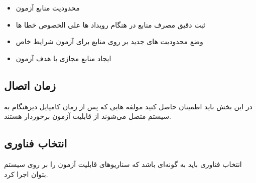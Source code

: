 \begin{itemize}
\item
محدودیت منابع آزمون
\item
ثبت دقیق مصرف منابع در هنگام رویداد ها علی الخصوص خطا ها
\item
وضع محدودیت های جدید بر روی منابع برای آزمون شرایط خاص
\item
ایجاد منابع مجازی با هدف آزمون
\end{itemize}
\subsection{زمان اتصال}
در این بخش باید اطمینان حاصل کنید مولفه هایی که پس از زمان کامپایل دیرهنگام به سیستم متصل می‌شوند از قابلیت آزمون برخوردار هستند.
\subsection{انتخاب فناوری}
انتخاب فناوری باید به گونه‌ای باشد که سناریو‌های قابلیت آزمون را بر روی سیستم بتوان اجرا کرد.